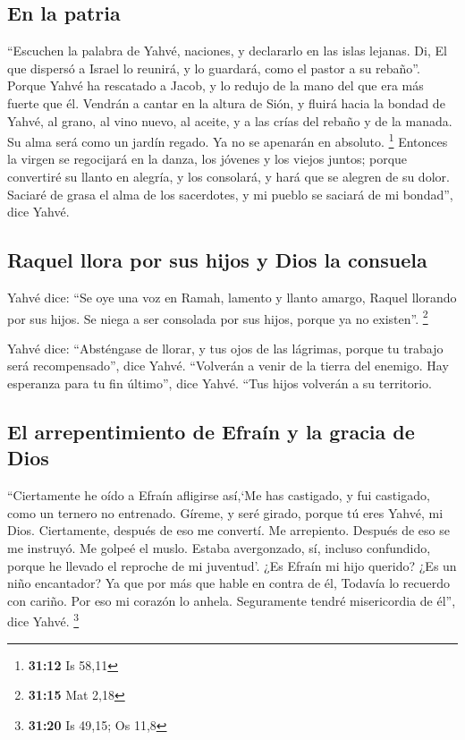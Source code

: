 \hypertarget{en-la-patria}{%
\subsection{En la patria}\label{en-la-patria}}

 ``Escuchen la palabra de Yahvé, naciones, y declararlo
en las islas lejanas. Di, El que dispersó a Israel lo reunirá, y lo
guardará, como el pastor a su rebaño''.  Porque Yahvé ha
rescatado a Jacob, y lo redujo de la mano del que era más fuerte que él.
 Vendrán a cantar en la altura de Sión, y fluirá hacia la
bondad de Yahvé, al grano, al vino nuevo, al aceite, y a las crías del
rebaño y de la manada. Su alma será como un jardín regado. Ya no se
apenarán en absoluto. \footnote{\textbf{31:12} Is 58,11} 
Entonces la virgen se regocijará en la danza, los jóvenes y los viejos
juntos; porque convertiré su llanto en alegría, y los consolará, y hará
que se alegren de su dolor.  Saciaré de grasa el alma de
los sacerdotes, y mi pueblo se saciará de mi bondad'', dice Yahvé.

\hypertarget{raquel-llora-por-sus-hijos-y-dios-la-consuela}{%
\subsection{Raquel llora por sus hijos y Dios la
consuela}\label{raquel-llora-por-sus-hijos-y-dios-la-consuela}}

 Yahvé dice: ``Se oye una voz en Ramah, lamento y llanto
amargo, Raquel llorando por sus hijos. Se niega a ser consolada por sus
hijos, porque ya no existen''. \footnote{\textbf{31:15} Mat 2,18}

 Yahvé dice: ``Absténgase de llorar, y tus ojos de las
lágrimas, porque tu trabajo será recompensado'', dice Yahvé. ``Volverán
a venir de la tierra del enemigo.  Hay esperanza para tu
fin último'', dice Yahvé. ``Tus hijos volverán a su territorio.

\hypertarget{el-arrepentimiento-de-efrauxedn-y-la-gracia-de-dios}{%
\subsection{El arrepentimiento de Efraín y la gracia de
Dios}\label{el-arrepentimiento-de-efrauxedn-y-la-gracia-de-dios}}

 ``Ciertamente he oído a Efraín afligirse así,`Me has
castigado, y fui castigado, como un ternero no entrenado. Gíreme, y seré
girado, porque tú eres Yahvé, mi Dios.  Ciertamente,
después de eso me convertí. Me arrepiento. Después de eso se me
instruyó. Me golpeé el muslo. Estaba avergonzado, sí, incluso
confundido, porque he llevado el reproche de mi juventud'.
 ¿Es Efraín mi hijo querido? ¿Es un niño encantador? Ya
que por más que hable en contra de él, Todavía lo recuerdo con cariño.
Por eso mi corazón lo anhela. Seguramente tendré misericordia de él'',
dice Yahvé. \footnote{\textbf{31:20} Is 49,15; Os 11,8}

